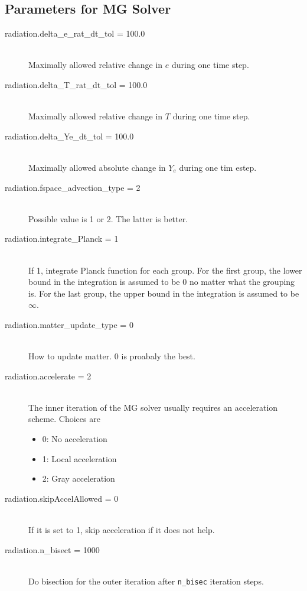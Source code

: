 \documentclass[11pt,letterpaper]{article}
\begin{document}
\subsection{Parameters for MG Solver}
\label{sec:mgpar}

\begin{description}
\item[radiation.delta\_e\_rat\_dt\_tol = 100.0] \hfill \\
  Maximally allowed relative change in $e$ during one time step.
\item[radiation.delta\_T\_rat\_dt\_tol = 100.0] \hfill \\
  Maximally allowed relative change in $T$ during one time step.
\item[radiation.delta\_Ye\_dt\_tol = 100.0] \hfill \\
  Maximally allowed absolute change in $Y_e$ during one tim estep.
\item[radiation.fspace\_advection\_type = 2] \hfill \\
  Possible value is 1 or 2.  The latter is better.
\item[radiation.integrate\_Planck = 1] \hfill \\
  If 1, integrate Planck function for each group.  For the first
  group, the lower bound in the integration is assumed to be 0 no
  matter what the grouping is.  For the last group, the upper bound in
  the integration is assumed to be $\infty$.
\item[radiation.matter\_update\_type = 0] \hfill \\
  How to update matter.  0 is proabaly the best.
\item[radiation.accelerate = 2] \hfill \\
  The inner iteration of the MG solver usually requires an
  acceleration scheme.  Choices are
  \begin{itemize}
    \item 0: No acceleration
    \item 1: Local acceleration
    \item 2: Gray acceleration
  \end{itemize}
\item[radiation.skipAccelAllowed = 0] \hfill \\
  If it is set to 1, skip acceleration if it does not help. 
\item[radiation.n\_bisect = 1000] \hfill \\
  Do bisection for the outer iteration after {\tt n\_bisec} iteration steps.

\end{description}
\end{document}
